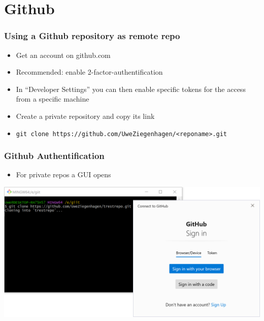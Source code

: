\documentclass[12pt,english]{beamer}
\begin{document}
\section{Github}

\begin{frame}
\frametitle{Using a Github repository as remote repo}

\begin{itemize}
\item Get an account on github.com
\item Recommended: enable 2-factor-authentification
\item In \enquote{Developer Settings} you can then enable specific tokens for the access from a specific machine 
\item Create a private repository and copy its link
\item \texttt{git clone https://github.com/UweZiegenhagen/<reponame>.git}
\end{itemize}
\end{frame}

\begin{frame}
\frametitle{Github Authentification}

\begin{itemize}
	\item For private repos a GUI opens
\end{itemize}

\includegraphics[width=\textwidth]{git-clone-win-1}

\end{frame}
\end{document}
